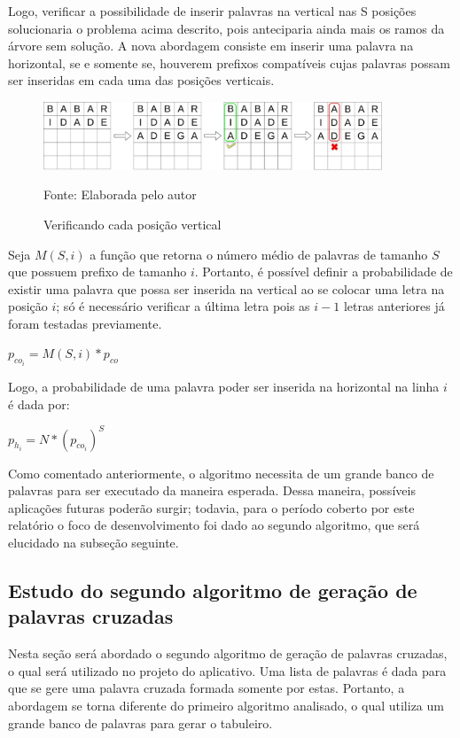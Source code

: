 Logo, verificar a possibilidade de inserir palavras na vertical nas S posições solucionaria o problema acima descrito, pois anteciparia ainda mais os ramos da árvore sem solução. A nova abordagem consiste em inserir uma palavra na horizontal, se e somente se, houverem prefixos compatíveis cujas palavras possam ser inseridas em cada uma das posições verticais.

\begin{figure}[H]
\centering
    \caption{Verificando cada posição vertical}
    \label{fig:scaffoldingcool}
    \includegraphics[width=0.9\textwidth]{Figuras/scaffoldingcool.jpg}
    
    Fonte: Elaborada pelo autor
\end{figure}

Seja $M(S,i)$ a função que retorna o número médio de palavras de tamanho $S$ que possuem prefixo de tamanho $i$. Portanto, é possível definir a probabilidade de existir uma palavra que possa ser inserida na vertical ao se colocar uma letra na posição $i$; só é necessário verificar a última letra pois as $i-1$ letras anteriores já foram testadas previamente.

\begin{center}
    \Large{$p_{co_{i}} = M(S,i)*p_{co}$}
\end{center}

Logo, a probabilidade de uma palavra poder ser inserida na horizontal na linha $i$ é dada por:

\begin{center}
    \Large{$p_{h_{i}} = N*(p_{co_{i}})^{S}$}
\end{center}

Como comentado anteriormente, o algoritmo necessita de um grande banco de palavras para ser executado da maneira esperada. Dessa maneira, possíveis aplicações futuras poderão surgir; todavia, para o período coberto por este relatório o foco de desenvolvimento foi dado ao segundo algoritmo, que será elucidado na subseção seguinte.

\subsection{Estudo do segundo algoritmo de geração de palavras cruzadas}
Nesta seção será abordado o segundo algoritmo de geração de palavras cruzadas, o qual será utilizado no projeto do aplicativo. Uma lista de palavras é dada para que se gere uma palavra cruzada formada somente por estas. Portanto, a abordagem se torna diferente do primeiro algoritmo analisado, o qual utiliza um grande banco de palavras para gerar o tabuleiro.

